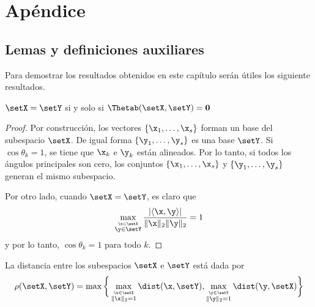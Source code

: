 	
	   \newpage
	
	\section{Apéndice}
	
	\subsection{Lemas y definiciones auxiliares}
	
	Para demostrar los resultados obtenidos en este capítulo serán útiles los siguiente resultados.
	\begin{lemma}
		$\setX = \setY$ si y solo si $\Thetab(\setX,\setY) = \mathbf{0}$
	\end{lemma}
	\begin{proof}
		Por construcción, los vectores $\{\x_1,\ldots,\x_s\}$ forman un base del subespacio $\setX$. De igual forma $\{\y_1,\ldots,\y_s\}$ es una base $\setY$. Si $\cos\theta_k=1$, se tiene que $\x_k$ e $\y_k$ están alineados. Por lo tanto, si todos los ángulos principales son cero, los conjuntos  $\{\x_1,\ldots,\x_s\}$ y $\{\y_1,\ldots,\y_s\}$ generan el mismo subespacio.
		
		Por otro lado, cuando $\setX=\setY$, es claro que 
		\[\max_{\stackrel{\x\in\setX}{\y\in\setY}}\frac{|\langle\x,\y\rangle|}{\|\x\|_2\|\y\|_2} = 1\]
		y por lo tanto, $\cos\theta_k = 1$ para todo $k$.
	\end{proof}
	
	\begin{definition}
		La distancia entre los subespacios $\setX$ e $\setY$ está dada por
		\begin{equation}
			\rho(\setX,\setY) = \max\bigg\{\max_{\stackrel{\x\in\setX}{\|\x\|_2=1}}\dist(\x,\setY),\max_{\stackrel{\y\in\setY}{\|\y\|_2=1}}\dist(\y,\setX) \bigg\}
			\label{Eq:GapDistance}
		\end{equation}
	\end{definition}
	
